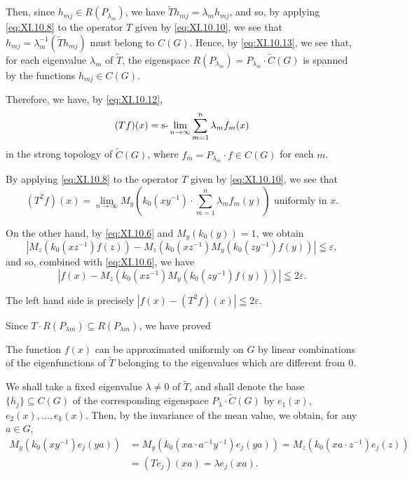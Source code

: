 Then, since $h_{mj} \in R(P_{\lambda_m})$, we have $\tilde{T}h_{mj} = \lambda_m h_{mj}$, and so, by applying \eqref{eq:XI.10.8} to the operator $T$ given by \eqref{eq:XI.10.10}, we see that $h_{mj} = \lambda_m^{-1}(\tilde{T}h_{mj})$ must belong to $C(G)$. Hence, by \eqref{eq:XI.10.13}, we see that, for each eigenvalue $\lambda_m$ of $\tilde{T}$, the eigenspace $R(P_{\lambda_m}) = P_{\lambda_m} \cdot \tilde{C}(G)$ is spanned by the functions $h_{mj} \in C(G)$. 

Therefore, we have, by \eqref{eq:XI.10.12}, 
\[
(Tf)(x)=\text{s-}\lim_{n\to\infty}\sum_{m=1}^n\lambda_m f_m(x)
\]
in the strong topology of $\tilde C(G)$, where $f_m=P_{\lambda_m}\cdot f\in C(G)$ for each $m$.

By applying \eqref{eq:XI.10.8} to the operator $T$ given by \eqref{eq:XI.10.10}, we see that 
\begin{equation}\label{eq:XI.10.14}
(T ^{2} f) (x) = \lim\limits _{n \rightarrow \infty} M _{y} \left(k _{0} (x y ^{-1}) \cdot \sum\limits_{m=1} ^{n} \lambda_{m} f _{m} (y)\right) \text{ uniformly in } x.
\end{equation}

On the other hand, by \eqref{eq:XI.10.6} and $M_y(k_0(y)) = 1$, we obtain 
\[
\left| M _{z} \left(k _{0} (x z ^{-1}) f (z)\right) - M _{z} \left(k _{0} (x z ^{-1}) M _{y} \left(k _{0} (z y ^{-1}) f (y)\right) \right. \right| \leqq \varepsilon ,
\]
and so, combined with \eqref{eq:XI.10.6}, we have 
\begin{equation}\label{eq:XI.10.15}
\left| f (x) - M _{z} \left(k _{0} \left(x z ^{-1}\right) M _{y} \left(k _{0} \left(z y ^{-1}\right) f (y)\right)\right) \right| \leqq 2 \varepsilon .
\end{equation}

The left hand side is precisely $|f(x) - (T^2 f)(x)| \leqq 2\varepsilon$. 

Since $T \cdot R(P_{\lambda m}) \subseteq R(P_{\lambda m})$, we have proved 

\begin{theorem}\label{thm:XI.10.Theorem.1} The function $f(x)$ can be approximated uniformly on $G$ by linear combinations of the eigenfunctions of $\tilde{T}$ belonging to the eigenvalues which are different from $0$. 
\end{theorem}

We shall take a fixed eigenvalue $\lambda \neq 0$ of $\tilde{T}$, and shall denote the base $\{h_j\} \subseteq C(G)$ of the corresponding eigenspace $P_{\lambda} \cdot \tilde{C}(G)$ by $e_1(x)$, $e_2(x), \ldots, e_k(x)$. Then, by the invariance of the mean value, we obtain, for any $a \in G$, 
\[
\begin{aligned} M _{y} \left(k _{0} (x y ^{-1}) e _{j} (y a)\right) & = M _{y} \left(k _{0} (x a \cdot a ^{-1} y ^{-1}) e _{j} (y a)\right) = M _{z} \left(k _{0} (x a \cdot z ^{-1}) e _{j} (z)\right) \\ & = \left(T e _{j}\right) (x a) = \lambda e _{j} (x a). \end{aligned}
\]

